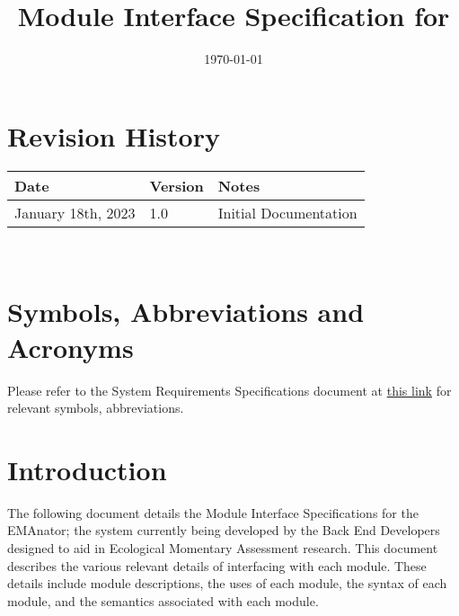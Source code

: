 \documentclass[12pt, titlepage]{article}
\begin{document}
\title{Module Interface Specification for \progname{}}

\author{\authname}

\date{\today}

\maketitle


\section{Revision History}

\begin{tabularx}{\textwidth}{p{3cm}p{2cm}X}
\toprule {\bf Date} & {\bf Version} & {\bf Notes}\\
\midrule
January 18th, 2023 & 1.0 & Initial Documentation\\
\bottomrule
\end{tabularx}

~\newpage

\section{Symbols, Abbreviations and Acronyms}

Please refer to the System Requirements Specifications document at \href{https://github.com/zakerl/Capstone_Project/blob/desDoc_Labeeb/docs/SRS/SRS.pdf}{this link} for relevant symbols, abbreviations.\\

\newpage

\tableofcontents

\newpage


\section{Introduction}

The following document details the Module Interface Specifications for the EMAnator; the system currently being developed by the Back End Developers designed to aid in Ecological Momentary Assessment research. This document describes the various relevant details of interfacing with each module. These details include  module descriptions, the uses of each module, the syntax of each module, and the semantics associated with each module.\\
\end{document}
